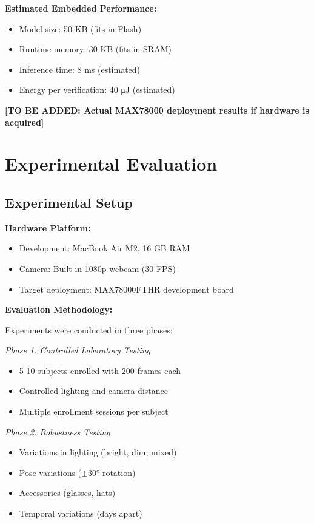 \documentclass[a4paper,12pt]{article}
\begin{document}
\textbf{Estimated Embedded Performance:}
\begin{itemize}
    \item Model size: 50 KB (fits in Flash)
    \item Runtime memory: 30 KB (fits in SRAM)
    \item Inference time: 8 ms (estimated)
    \item Energy per verification: 40 μJ (estimated)
\end{itemize}

\textbf{[TO BE ADDED: Actual MAX78000 deployment results if hardware is acquired]}

\newpage

\section{Experimental Evaluation}

\subsection{Experimental Setup}

\textbf{Hardware Platform:}
\begin{itemize}
    \item Development: MacBook Air M2, 16 GB RAM
    \item Camera: Built-in 1080p webcam (30 FPS)
    \item Target deployment: MAX78000FTHR development board
\end{itemize}

\textbf{Evaluation Methodology:}

Experiments were conducted in three phases:

\textit{Phase 1: Controlled Laboratory Testing}
\begin{itemize}
    \item 5-10 subjects enrolled with 200 frames each
    \item Controlled lighting and camera distance
    \item Multiple enrollment sessions per subject
\end{itemize}

\textit{Phase 2: Robustness Testing}
\begin{itemize}
    \item Variations in lighting (bright, dim, mixed)
    \item Pose variations ($\pm 30°$ rotation)
    \item Accessories (glasses, hats)
    \item Temporal variations (days apart)
\end{itemize}
\end{document}
